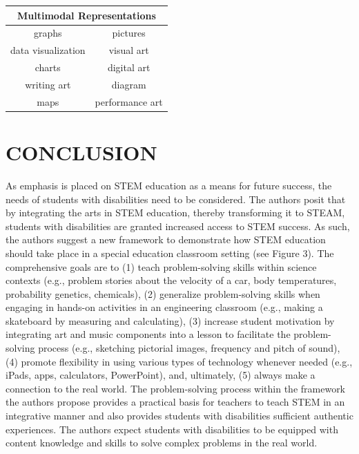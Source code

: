 \documentclass[11.5pt]{sig-alternate} %
\begin{document}
\begin{large}
\begin{table}[ht]
\begin{tabular}{|c|c|}
\hline
\multicolumn{2}{|c|}{Multimodal Representations} \\ \hline
graphs & pictures \\ \hline
data visualization & visual art \\ \hline
charts & digital art \\ \hline
writing art & diagram \\ \hline
maps & performance art \\ \hline
\end{tabular}
\end{table}

\section*{CONCLUSION}

As emphasis is placed on STEM education as a means for future success, the needs of students with disabilities need to be considered.  The authors posit that by integrating the arts in STEM education, thereby transforming it to STEAM, students with disabilities are granted increased access to STEM success. As such, the authors suggest a new framework to demonstrate how STEM education should take place in a special education classroom setting (see Figure 3). The comprehensive goals are to (1) teach problem-solving skills within science contexts (e.g., problem stories about the velocity of a car, body temperatures, probability genetics, chemicals), (2) generalize problem-solving skills when engaging in hands-on activities in an engineering classroom (e.g., making a skateboard by measuring and calculating), (3) increase student motivation by integrating art and music components into a lesson to facilitate the problem-solving process (e.g., sketching pictorial images, frequency and pitch of sound), (4) promote flexibility in using various types of technology whenever needed (e.g., iPads, apps, calculators, PowerPoint), and, ultimately, (5) always make a connection to the real world. The problem-solving process within the framework the authors propose provides a practical basis for teachers to teach STEM in an integrative manner and also provides students with disabilities sufficient authentic experiences. The authors expect students with disabilities to be equipped with content knowledge and skills to solve complex problems in the real world. 


\end{large}
\end{document}
